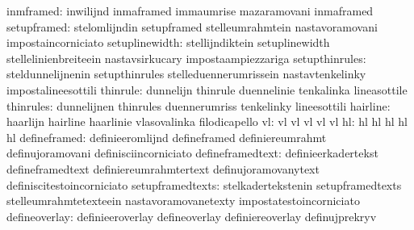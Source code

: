                        inmframed: inwilijnd                        inmaframed
                                  immaumrise                       mazaramovani
                                  inmaframed
                     setupframed: stelomlijndin                    setupframed
                                  stelleumrahmtein                 nastavoramovani
                                  impostaincorniciato
                  setuplinewidth: stellijndiktein                  setuplinewidth
                                  stellelinienbreiteein            nastavsirkucary
                                  impostaampiezzariga
                  setupthinrules: steldunnelijnenin                setupthinrules
                                  stelleduennerumrissein           nastavtenkelinky
                                  impostalineesottili
                        thinrule: dunnelijn                        thinrule
                                  duennelinie                      tenkalinka
                                  lineasottile
                       thinrules: dunnelijnen                      thinrules
                                  duennerumriss                    tenkelinky
                                  lineesottili
                        hairline: haarlijn                         hairline
                                  haarlinie                        vlasovalinka
                                  filodicapello
                              vl: vl                               vl
                                  vl                               vl
                                  vl
                              hl: hl                               hl
                                  hl                               hl
                                  hl
                    defineframed: definieeromlijnd                 defineframed
                                  definiereumrahmt                 definujoramovani
                                  definisciincorniciato
                defineframedtext: definieerkadertekst              defineframedtext
                                  definiereumrahmtertext           definujoramovanytext
                                  definiscitestoincorniciato
                setupframedtexts: stelkadertekstenin               setupframedtexts
                                  stelleumrahmtetexteein           nastavoramovanetexty
                                  impostatestoincorniciato
                   defineoverlay: definieeroverlay                 defineoverlay
                                  definiereoverlay                 definujprekryv
